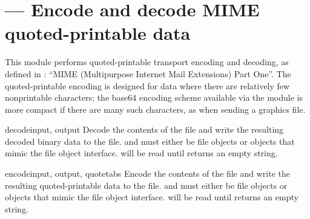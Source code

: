 \section{ ---
         Encode and decode MIME quoted-printable data}



This module performs quoted-printable transport encoding and decoding,
as defined in : ``MIME (Multipurpose Internet Mail Extensions)
Part One''.  The quoted-printable encoding is designed for data where
there are relatively few nonprintable characters; the base64 encoding
scheme available via the  module is more compact if there
are many such characters, as when sending a graphics file.


\begin{funcdesc}{decode}{input, output}
Decode the contents of the  file and write the resulting
decoded binary data to the  file.
 and  must either be file objects or objects that
mimic the file object interface.  will be read until
 returns an empty string.
\end{funcdesc}

\begin{funcdesc}{encode}{input, output, quotetabs}
Encode the contents of the  file and write the resulting
quoted-printable data to the  file.
 and  must either be file objects or objects that
mimic the file object interface.  will be read until
 returns an empty string.
\end{funcdesc}


\begin{seealso}
\end{seealso}
